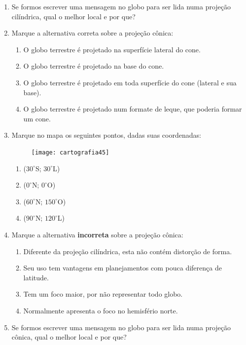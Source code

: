 \begin{enumerate}
\item Se formos escrever uma mensagem no globo para ser lida numa projeção cilíndrica, qual o melhor local e por que?

\item Marque a alternativa correta sobre a projeção cônica:
\begin{enumerate}
\item O globo terrestre é projetado na superfície lateral do cone.
\item O globo terrestre é projetado na base do cone.
\item O globo terrestre é projetado em toda superfície do cone (lateral e sua base).
\item O globo terrestre é projetado num formate de leque, que poderia formar um cone.
\end{enumerate}

\item Marque no mapa os seguintes pontos, dadas suas coordenadas:

\begin{figure}[H]
\centering
\texttt{[image: cartografia45]}

\end{figure}

\begin{enumerate}
\item ($30^{\circ}$S; $30^{\circ}$L)
\item ($0^{\circ}$N; $0^{\circ}$O)
\item ($60^{\circ}$N; $150^{\circ}$O)
\item ($90^{\circ}$N; $120^{\circ}$L)
\end{enumerate}

\item Marque a alternativa \textbf{incorreta} sobre a projeção cônica:
\begin{enumerate}
\item Diferente da projeção cilíndrica, esta não contém distorção de forma.
\item Seu uso tem vantagens em planejamentos com pouca diferença de latitude.
\item Tem um foco maior, por não representar todo globo.
\item Normalmente apresenta o foco no hemisfério norte.
\end{enumerate}

\item Se formos escrever uma mensagem no globo para ser lida numa projeção cônica, qual o melhor local e por que?




\end{enumerate}
